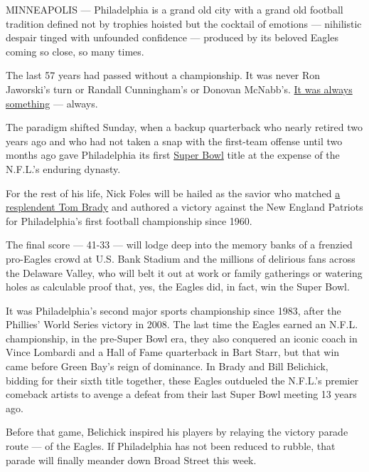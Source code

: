 MINNEAPOLIS --- Philadelphia is a grand old city with a grand old
football tradition defined not by trophies hoisted but the cocktail of
emotions --- nihilistic despair tinged with unfounded confidence ---
produced by its beloved Eagles coming so close, so many times.

The last 57 years had passed without a championship. It was never Ron
Jaworski's turn or Randall Cunningham's or Donovan McNabb's.
\href{https://www.nytimes3xbfgragh.onion/2018/02/04/sports/football/philadelphia.html?rref=collection\%2Fsectioncollection\%2Fsports\&action=click\&contentCollection=sports\&region=rank\&module=package\&version=highlights\&contentPlacement=2\&pgtype=sectionfront}{It
was always something} --- always.

The paradigm shifted Sunday, when a backup quarterback who nearly
retired two years ago and who had not taken a snap with the first-team
offense until two months ago gave Philadelphia its first
\href{https://www.nytimes3xbfgragh.onion/2019/02/03/sports/super-bowl-patriots-rams.html}{Super
Bowl} title at the expense of the N.F.L.'s enduring dynasty.

For the rest of his life, Nick Foles will be hailed as the savior who
matched
\href{https://www.nytimes3xbfgragh.onion/2018/02/01/sports/football/tom-brady-super-bowl-lii.html}{a
resplendent Tom Brady} and authored a victory against the New England
Patriots for Philadelphia's first football championship since 1960.

The final score --- 41-33 --- will lodge deep into the memory banks of a
frenzied pro-Eagles crowd at U.S. Bank Stadium and the millions of
delirious fans across the Delaware Valley, who will belt it out at work
or family gatherings or watering holes as calculable proof that, yes,
the Eagles did, in fact, win the Super Bowl.

It was Philadelphia's second major sports championship since 1983, after
the Phillies' World Series victory in 2008. The last time the Eagles
earned an N.F.L. championship, in the pre-Super Bowl era, they also
conquered an iconic coach in Vince Lombardi and a Hall of Fame
quarterback in Bart Starr, but that win came before Green Bay's reign of
dominance. In Brady and Bill Belichick, bidding for their sixth title
together, these Eagles outdueled the N.F.L.'s premier comeback artists
to avenge a defeat from their last Super Bowl meeting 13 years ago.

Before that game, Belichick inspired his players by relaying the victory
parade route --- of the Eagles. If Philadelphia has not been reduced to
rubble, that parade will finally meander down Broad Street this week.

